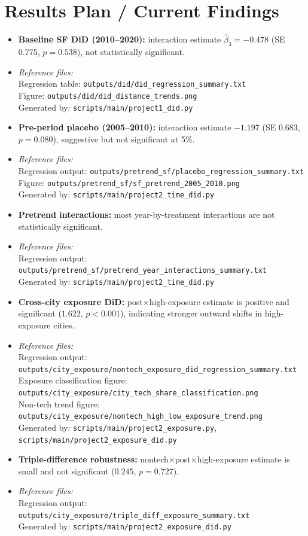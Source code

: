 \documentclass[12pt]{article}
\begin{document}
\section{Results Plan / Current Findings}
\begin{itemize}[leftmargin=*]
\item \textbf{Baseline SF DiD (2010--2020):} interaction estimate $\hat\beta_3=-0.478$ (SE 0.775, $p=0.538$), not statistically significant.
\item \textit{Reference files:}
\\ Regression table: \texttt{outputs/did/did\_regression\_summary.txt}
\\ Figure: \texttt{outputs/did/did\_distance\_trends.png}
\\ Generated by: \texttt{scripts/main/project1\_did.py}
\item \textbf{Pre-period placebo (2005--2010):} interaction estimate $-1.197$ (SE 0.683, $p=0.080$), suggestive but not significant at 5\%.
\item \textit{Reference files:}
\\ Regression output: \texttt{outputs/pretrend\_sf/placebo\_regression\_summary.txt}
\\ Figure: \texttt{outputs/pretrend\_sf/sf\_pretrend\_2005\_2010.png}
\\ Generated by: \texttt{scripts/main/project2\_time\_did.py}
\item \textbf{Pretrend interactions:} most year-by-treatment interactions are not statistically significant.
\item \textit{Reference files:}
\\ Regression output: \texttt{outputs/pretrend\_sf/pretrend\_year\_interactions\_summary.txt}
\\ Generated by: \texttt{scripts/main/project2\_time\_did.py}
\item \textbf{Cross-city exposure DiD:} post$\times$high-exposure estimate is positive and significant ($1.622$, $p<0.001$), indicating stronger outward shifts in high-exposure cities.
\item \textit{Reference files:}
\\ Regression output: \texttt{outputs/city\_exposure/nontech\_exposure\_did\_regression\_summary.txt}
\\ Exposure classification figure: \texttt{outputs/city\_exposure/city\_tech\_share\_classification.png}
\\ Non-tech trend figure: \texttt{outputs/city\_exposure/nontech\_high\_low\_exposure\_trend.png}
\\ Generated by: \texttt{scripts/main/project2\_exposure.py}, \texttt{scripts/main/project2\_exposure\_did.py}
\item \textbf{Triple-difference robustness:} nontech$\times$post$\times$high-exposure estimate is small and not significant ($0.245$, $p=0.727$).
\item \textit{Reference files:}
\\ Regression output: \texttt{outputs/city\_exposure/triple\_diff\_exposure\_summary.txt}
\\ Generated by: \texttt{scripts/main/project2\_exposure\_did.py}
\end{itemize}
\end{document}
